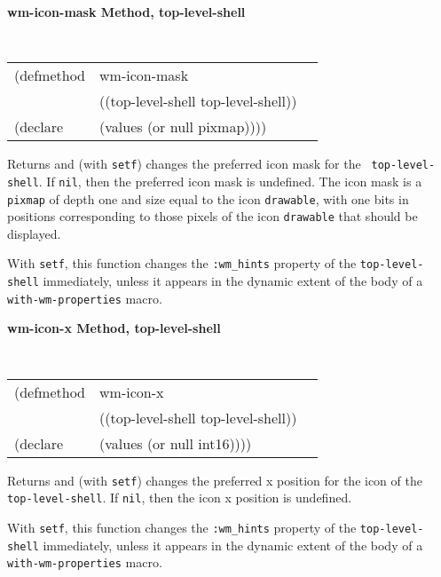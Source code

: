 {\samepage
{\large {\bf wm-icon-mask \hfill Method, top-level-shell}}
\begin{flushright} \parbox[t]{6.125in}{
\tt
\begin{tabular}{lll}
\raggedright
(defmethod & wm-icon-mask & \\
           & ((top-level-shell  top-level-shell)) \\
(declare   & (values (or null pixmap))))
\end{tabular}
\rm

}\end{flushright}}

\begin{flushright} \parbox[t]{6.125in}{
Returns and (with {\tt setf}) changes the preferred icon mask for the
{\tt
top-level-shell}. If {\tt nil}, then the preferred icon mask is
undefined. The icon mask is a {\tt pixmap} of depth one and size equal
to the icon {\tt drawable}, with one bits in positions corresponding to
those pixels of the icon {\tt drawable} that should be displayed.

With {\tt setf}, this function changes the {\tt :wm\_hints} property of
the {\tt top-level-shell} immediately, unless it appears in the dynamic extent of the
body of a {\tt with-wm-properties} macro.


}\end{flushright}

{\samepage
{\large {\bf wm-icon-x \hfill Method, top-level-shell}}
\begin{flushright} \parbox[t]{6.125in}{
\tt
\begin{tabular}{lll}
\raggedright
(defmethod & wm-icon-x & \\
           & ((top-level-shell  top-level-shell)) \\
(declare   & (values (or null int16))))
\end{tabular}
\rm

}\end{flushright}}

\begin{flushright} \parbox[t]{6.125in}{
Returns and (with {\tt setf}) changes the preferred x position for the icon of the {\tt
top-level-shell}. If {\tt nil}, then the icon x position is
undefined.

With {\tt setf}, this function changes the {\tt :wm\_hints} property of
the {\tt top-level-shell} immediately, unless it appears in the dynamic extent of the
body of a {\tt with-wm-properties} macro.


}\end{flushright}

